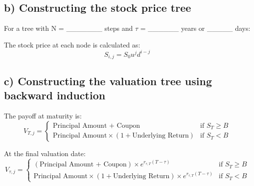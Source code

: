 \documentclass[12pt]{article}
\begin{document}
\subsection*{b) Constructing the stock price tree}
For a tree with N = \_\_\_\_\_\_\_ steps and $\tau$ = \_\_\_\_\_\_ years or \_\_\_\_\_ days:

The stock price at each node is calculated as:
\begin{equation}
S_{i,j} = S_0u^jd^{i-j}
\end{equation}

\subsection*{c) Constructing the valuation tree using backward induction}
The payoff at maturity is:
\begin{equation}
V_{T,j} = \begin{cases}
\text{Principal Amount + Coupon} & \text{if } S_T \geq B \\
\text{Principal Amount} \times (1 + \text{Underlying Return}) & \text{if } S_T < B
\end{cases}
\end{equation}

At the final valuation date:
\begin{equation}
V_{\tau,j} = \begin{cases}
(\text{Principal Amount + Coupon}) \times e^{r_{\tau,T}(T-\tau)} & \text{if } S_T \geq B \\
\text{Principal Amount} \times (1 + \text{Underlying Return}) \times e^{r_{\tau,T}(T-\tau)} & \text{if } S_T < B
\end{cases}
\end{equation}

\end{document}
